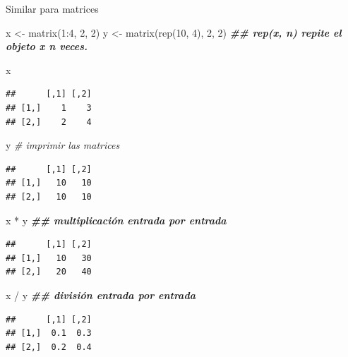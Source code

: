\documentclass[
  12pt,
]{book}
\newenvironment{Shaded}{\begin{snugshade}}{\end{snugshade}}
\newcommand{\CommentTok}[1]{\textcolor[rgb]{0.56,0.35,0.01}{\textit{#1}}}
\newcommand{\DecValTok}[1]{\textcolor[rgb]{0.00,0.00,0.81}{#1}}
\newcommand{\DocumentationTok}[1]{\textcolor[rgb]{0.56,0.35,0.01}{\textbf{\textit{#1}}}}
\newcommand{\FunctionTok}[1]{\textcolor[rgb]{0.00,0.00,0.00}{#1}}
\newcommand{\NormalTok}[1]{#1}
\newcommand{\OtherTok}[1]{\textcolor[rgb]{0.56,0.35,0.01}{#1}}
\newcommand{\SpecialCharTok}[1]{\textcolor[rgb]{0.00,0.00,0.00}{#1}}
\begin{document}
Similar para matrices

\begin{Shaded}
\begin{Highlighting}[]
\NormalTok{x }\OtherTok{\textless{}{-}} \FunctionTok{matrix}\NormalTok{(}\DecValTok{1}\SpecialCharTok{:}\DecValTok{4}\NormalTok{, }\DecValTok{2}\NormalTok{, }\DecValTok{2}\NormalTok{)}
\NormalTok{y }\OtherTok{\textless{}{-}} \FunctionTok{matrix}\NormalTok{(}\FunctionTok{rep}\NormalTok{(}\DecValTok{10}\NormalTok{, }\DecValTok{4}\NormalTok{), }\DecValTok{2}\NormalTok{, }\DecValTok{2}\NormalTok{)  }\DocumentationTok{\#\# rep(x, n) repite el objeto x n veces.}

\NormalTok{x}
\end{Highlighting}
\end{Shaded}

\begin{verbatim}
##      [,1] [,2]
## [1,]    1    3
## [2,]    2    4
\end{verbatim}

\begin{Shaded}
\begin{Highlighting}[]
\NormalTok{y }\CommentTok{\# imprimir las matrices}
\end{Highlighting}
\end{Shaded}

\begin{verbatim}
##      [,1] [,2]
## [1,]   10   10
## [2,]   10   10
\end{verbatim}

\begin{Shaded}
\begin{Highlighting}[]
\NormalTok{x }\SpecialCharTok{*}\NormalTok{ y }\DocumentationTok{\#\# multiplicación entrada por entrada}
\end{Highlighting}
\end{Shaded}

\begin{verbatim}
##      [,1] [,2]
## [1,]   10   30
## [2,]   20   40
\end{verbatim}

\begin{Shaded}
\begin{Highlighting}[]
\NormalTok{x }\SpecialCharTok{/}\NormalTok{ y }\DocumentationTok{\#\# división entrada por entrada}
\end{Highlighting}
\end{Shaded}

\begin{verbatim}
##      [,1] [,2]
## [1,]  0.1  0.3
## [2,]  0.2  0.4
\end{verbatim}
\end{document}
